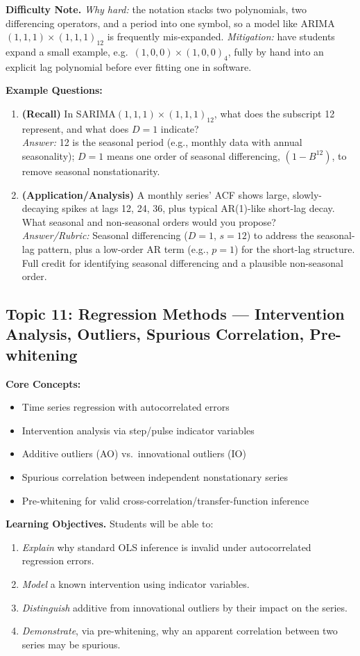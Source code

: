 \documentclass[11pt]{article}
\begin{document}
\textbf{Difficulty Note.} \emph{Why hard:} the notation stacks two polynomials, two differencing operators, and a period into one symbol, so a model like ARIMA$(1,1,1)\times(1,1,1)_{12}$ is frequently mis-expanded. \emph{Mitigation:} have students expand a small example, e.g.\ $(1,0,0)\times(1,0,0)_4$, fully by hand into an explicit lag polynomial before ever fitting one in software.

\textbf{Example Questions:}
\begin{enumerate}
\item \textbf{(Recall)} In SARIMA$(1,1,1)\times(1,1,1)_{12}$, what does the subscript 12 represent, and what does $D=1$ indicate? \\
\emph{Answer:} 12 is the seasonal period (e.g., monthly data with annual seasonality); $D=1$ means one order of seasonal differencing, $(1-B^{12})$, to remove seasonal nonstationarity.
\item \textbf{(Application/Analysis)} A monthly series' ACF shows large, slowly-decaying spikes at lags 12, 24, 36, plus typical AR(1)-like short-lag decay. What seasonal and non-seasonal orders would you propose? \\
\emph{Answer/Rubric:} Seasonal differencing ($D=1$, $s=12$) to address the seasonal-lag pattern, plus a low-order AR term (e.g., $p=1$) for the short-lag structure. Full credit for identifying seasonal differencing and a plausible non-seasonal order.
\end{enumerate}

\subsection{Topic 11: Regression Methods --- Intervention Analysis, Outliers, Spurious Correlation, Pre-whitening}

\textbf{Core Concepts:}
\begin{itemize}
\item Time series regression with autocorrelated errors
\item Intervention analysis via step/pulse indicator variables
\item Additive outliers (AO) vs.\ innovational outliers (IO)
\item Spurious correlation between independent nonstationary series
\item Pre-whitening for valid cross-correlation/transfer-function inference
\end{itemize}

\textbf{Learning Objectives.} Students will be able to:
\begin{enumerate}
\item \emph{Explain} why standard OLS inference is invalid under autocorrelated regression errors.
\item \emph{Model} a known intervention using indicator variables.
\item \emph{Distinguish} additive from innovational outliers by their impact on the series.
\item \emph{Demonstrate}, via pre-whitening, why an apparent correlation between two series may be spurious.
\end{enumerate}
\end{document}
